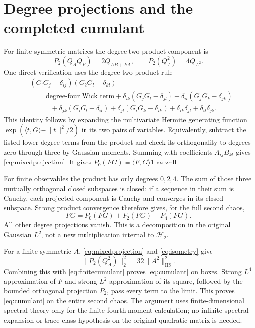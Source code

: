 \documentclass[11pt]{article}
\newcommand{\Hh}{\mathcal H}
\newcommand{\HS}{\mathrm{HS}}
\begin{document}
\section{Degree projections and the completed cumulant}
For finite symmetric matrices the degree-two product component is
\begin{equation}\label{eq:mixedprojection}
 P_2(Q_AQ_B)=2Q_{AB+BA},\qquad P_2(Q_A^2)=4Q_{A^2}.
\end{equation}
One direct verification uses the degree-two product rule
\begin{align*}
 &(G_iG_j-\delta_{ij})(G_kG_l-\delta_{kl})\\
 &\quad=\text{degree-four Wick term}
 +\delta_{ik}(G_jG_l-\delta_{jl})
 +\delta_{il}(G_jG_k-\delta_{jk})\\
 &\qquad\quad+\delta_{jk}(G_iG_l-\delta_{il})
 +\delta_{jl}(G_iG_k-\delta_{ik})
 +\delta_{ik}\delta_{jl}+\delta_{il}\delta_{jk}.
\end{align*}
This identity follows by expanding the multivariate Hermite
generating function $\exp(\langle t,G\rangle-\|t\|^2/2)$ in its
two pairs of variables. Equivalently, subtract the listed lower
degree terms from the product and check its orthogonality to
degrees zero through three by Gaussian moments. Summing with
coefficients $A_{ij}B_{kl}$ gives \eqref{eq:mixedprojection}.
It gives $P_0(FG)=\langle F,G\rangle1$ as well.

For finite observables the product has only degrees $0,2,4$.
The sum of those three mutually orthogonal closed subspaces is
closed: if a sequence in their sum is Cauchy, each projected
component is Cauchy and converges in its closed subspace. Strong
product convergence therefore gives, for the full second chaos,
\begin{equation}\label{eq:decomposition}
 FG=P_0(FG)+P_2(FG)+P_4(FG).
\end{equation}
All other degree projections vanish. This is a decomposition in
the original Gaussian $L^2$, not a new multiplication internal
to $\Hh_2$.

For a finite symmetric $A$, \eqref{eq:mixedprojection} and
\eqref{eq:isometry} give
\[
 \|P_2(Q_A^2)\|_2^2=32\|A^2\|_\HS^2.
\]
Combining this with \eqref{eq:finitecumulant} proves
\eqref{eq:cumulant} on boxes. Strong $L^4$ approximation of $F$
and strong $L^2$ approximation of its square, followed by the
bounded orthogonal projection $P_2$, pass every term to the limit.
This proves \eqref{eq:cumulant} on the entire second chaos.
The argument uses finite-dimensional spectral theory only for the
finite fourth-moment calculation; no infinite spectral expansion
or trace-class hypothesis on the original quadratic matrix is needed.
\end{document}

